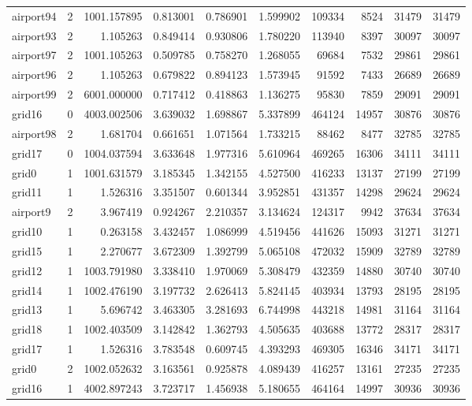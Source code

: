 \documentclass[../../../thesis.tex]{subfiles}
\begin{document}
\begin{longtable}{|l|r|r|r|r|r|r|r|r|r|}
airport94 & 2 & 1001.157895 & 0.813001 & 0.786901 & 1.599902 & 109334 & 8524 & 31479 & 31479 \\
airport93 & 2 & 1.105263 & 0.849414 & 0.930806 & 1.780220 & 113940 & 8397 & 30097 & 30097 \\
airport97 & 2 & 1001.105263 & 0.509785 & 0.758270 & 1.268055 & 69684 & 7532 & 29861 & 29861 \\
airport96 & 2 & 1.105263 & 0.679822 & 0.894123 & 1.573945 & 91592 & 7433 & 26689 & 26689 \\
airport99 & 2 & 6001.000000 & 0.717412 & 0.418863 & 1.136275 & 95830 & 7859 & 29091 & 29091 \\
grid16 & 0 & 4003.002506 & 3.639032 & 1.698867 & 5.337899 & 464124 & 14957 & 30876 & 30876 \\
airport98 & 2 & 1.681704 & 0.661651 & 1.071564 & 1.733215 & 88462 & 8477 & 32785 & 32785 \\
grid17 & 0 & 1004.037594 & 3.633648 & 1.977316 & 5.610964 & 469265 & 16306 & 34111 & 34111 \\
grid0 & 1 & 1001.631579 & 3.185345 & 1.342155 & 4.527500 & 416233 & 13137 & 27199 & 27199 \\
grid11 & 1 & 1.526316 & 3.351507 & 0.601344 & 3.952851 & 431357 & 14298 & 29624 & 29624 \\
airport9 & 2 & 3.967419 & 0.924267 & 2.210357 & 3.134624 & 124317 & 9942 & 37634 & 37634 \\
grid10 & 1 & 0.263158 & 3.432457 & 1.086999 & 4.519456 & 441626 & 15093 & 31271 & 31271 \\
grid15 & 1 & 2.270677 & 3.672309 & 1.392799 & 5.065108 & 472032 & 15909 & 32789 & 32789 \\
grid12 & 1 & 1003.791980 & 3.338410 & 1.970069 & 5.308479 & 432359 & 14880 & 30740 & 30740 \\
grid14 & 1 & 1002.476190 & 3.197732 & 2.626413 & 5.824145 & 403934 & 13793 & 28195 & 28195 \\
grid13 & 1 & 5.696742 & 3.463305 & 3.281693 & 6.744998 & 443218 & 14981 & 31164 & 31164 \\
grid18 & 1 & 1002.403509 & 3.142842 & 1.362793 & 4.505635 & 403688 & 13772 & 28317 & 28317 \\
grid17 & 1 & 1.526316 & 3.783548 & 0.609745 & 4.393293 & 469305 & 16346 & 34171 & 34171 \\
grid0 & 2 & 1002.052632 & 3.163561 & 0.925878 & 4.089439 & 416257 & 13161 & 27235 & 27235 \\
grid16 & 1 & 4002.897243 & 3.723717 & 1.456938 & 5.180655 & 464164 & 14997 & 30936 & 30936 \\

\end{longtable}
\end{document}
